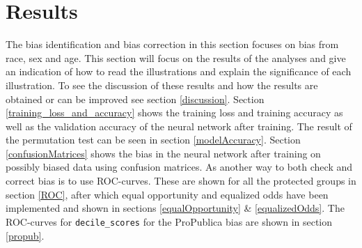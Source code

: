 \documentclass[11pt, fleqn, titlepage]{article}
\begin{document}

	
	\section{Results}\label{results}
	The bias identification and bias correction in this section focuses on bias from race, sex and age. This section will focus on the results of the analyses and give an indication of how to read the illustrations and explain the significance of each illustration. To see the discussion of these results and how the results are obtained or can be improved see section \ref{discussion}. Section \ref{training_loss_and_accuracy} shows the training loss and training accuracy as well as the validation accuracy of the neural network after training. The result of the permutation test can be seen in section \ref{modelAccuracy}. Section \ref{confusionMatrices} shows the bias in the neural network after training on possibly biased data using confusion matrices. As another way to both check and correct bias is to use ROC-curves. These are shown for all the protected groups in section \ref{ROC}, after which equal opportunity and equalized odds have been implemented and shown in sections \ref{equalOpportunity} \& \ref{equalizedOdds}. The ROC-curves for \texttt{decile\_scores} for the ProPublica bias are shown in section \ref{propub}.
	
\end{document}
